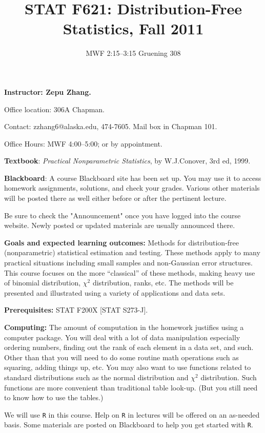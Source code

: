 \documentclass{article}
\begin{document}
\title{STAT F621: Distribution-Free Statistics, Fall 2011}
\author{MWF 2:15--3:15 Gruening 308}
\date{}
\maketitle

\textbf{\large Instructor: Zepu Zhang.}

Office location: 306A Chapman.

Contact: zzhang6@alaska.edu, 474-7605.  Mail box in Chapman 101.

Office Hours: MWF 4:00--5:00; or by appointment.

\bigskip
\textbf{\large Textbook}:
\textit{Practical Nonparametric Statistics},
by W.\@ J.\@ Conover, 3rd ed, 1999.

\bigskip
\textbf{\large Blackboard}:
A course Blackboard site has been set up. You may use it to access
homework assignments, solutions, and check your grades.
Various other materials will be posted there as well either before or after the pertinent
lecture.

Be sure to check the "Announcement" once you have logged into the course
website. Newly posted or updated materials are usually announced there.

\bigskip
\textbf{\large Goals and expected learning outcomes:}
Methods for distribution-free (nonparametric) statistical estimation and
testing. These methods apply to many practical situations including
small samples and non-Gaussian error structures.
This course focuses on the more ``classical'' of these methods,
making heavy use of binomial distribution, $\chi^2$ distribution, ranks, etc.
The methods will be presented and illustrated using a variety
of applications and data sets.

\bigskip
\textbf{\large Prerequisites:}
STAT F200X [STAT S273-J].

\bigskip
\textbf{\large Computing:}
The amount of computation in the homework justifies using a computer package.
You will deal with a lot of data manipulation especially ordering
numbers, finding out the rank of each element in a data set, and such.
Other than that you will need to do some routine math operations such as
squaring, adding things up, etc.
You may also want to use functions related to standard distributions
such as the normal distribution and $\chi^2$ distribution.
Such functions are more convenient than traditional table look-up.
(But you still need to know how to use the tables.)

We will use \texttt{R} in this course.
Help on \texttt{R} in lectures will be offered on an as-needed basis.
Some materials are posted on Blackboard to help you get started with
\texttt{R}.
\end{document}
